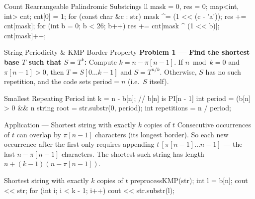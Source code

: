 \documentclass[10pt]{article}
\newcommand{\complexity}[1]{%
  \tcbox[on line,
    colback=tagbg,
    colframe=tagbg,
    boxrule=0pt,
    arc=2pt,
    boxsep=0pt,
    left=3.5pt, right=3.5pt, top=1.5pt, bottom=1.5pt
  ]{\color{tagtext}\scriptsize\bfseries\ensuremath{#1}}%
}
\begin{document}
\begin{vscode}{Count Rearrangeable Palindromic Substrings \complexity{O(|\Sigma| \cdot N \log N)}}
ll mask = 0, res = 0;
map<int, int> cnt;
cnt[0] = 1;
for (const char &c : str) 
{
    mask ^= (1 << (c - 'a'));
    res += cnt[mask];
    for (int b = 0; b < 26; b++)
        res += cnt[mask ^ (1 << b)];
    cnt[mask]++;
}
\end{vscode}

\begin{conceptbox}{String Periodicity \& KMP Border Property}
    \textbf{Problem 1 --- Find the shortest base $T$ such that $S = T^k$:} Compute $k = n - \pi[n - 1]$. If $n \bmod k = 0$ and $\pi[n - 1] > 0$, then $T = S[0 \dots k - 1]$ and $S = T^{n / k}$. Otherwise, $S$ has no such repetition, and the code sets $\text{period} = n$ (i.e.\ $S$ itself).
\end{conceptbox}

\begin{vscode}{Smallest Repeating Period \complexity{O(N)}}
int k = n - b[n]; // b[n] is PI[n - 1]
int period = (b[n] > 0 && n %
string root = str.substr(0, period);
int repetitions = n / period;
\end{vscode}

\begin{conceptbox}{Application --- Shortest string with exactly $k$ copies of $t$}
    Consecutive occurrences of $t$ can overlap by $\pi[n - 1]$ characters (its longest border). So each new occurrence after the first only requires appending $t\,[\pi[n-1] \dots n-1]$ --- the last $n - \pi[n-1]$ characters. The shortest such string has length $n + (k - 1)(n - \pi[n-1])$.
\end{conceptbox}

\begin{vscode}{Shortest string with exactly $k$ copies of $t$}
preprocessKMP(str);
int l = b[n];
cout << str;
for (int i{}; i < k - 1; i++)
    cout << str.substr(l);
\end{vscode}
\end{document}
